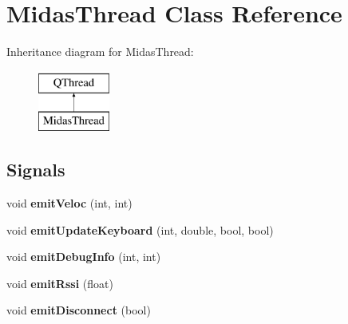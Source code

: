 \hypertarget{class_midas_thread}{\section{Midas\+Thread Class Reference}
\label{class_midas_thread}
}
Inheritance diagram for Midas\+Thread\+:\begin{figure}[H]
\begin{center}
\leavevmode
\includegraphics[height=2.000000cm]{class_midas_thread}
\end{center}
\end{figure}
\subsection*{Signals}
\begin{DoxyCompactItemize}
\item 
\hypertarget{class_midas_thread_acbe7ade3692dc7ff6e4ea467f5ea1ca5}{void {\bfseries emit\+Veloc} (int, int)}\label{class_midas_thread_acbe7ade3692dc7ff6e4ea467f5ea1ca5}

\item 
\hypertarget{class_midas_thread_ac05c3c7378833a0a86ffe4caabbbaca0}{void {\bfseries emit\+Update\+Keyboard} (int, double, bool, bool)}\label{class_midas_thread_ac05c3c7378833a0a86ffe4caabbbaca0}

\item 
\hypertarget{class_midas_thread_a73ff011dab8fd9eca9080b60dd3dcb62}{void {\bfseries emit\+Debug\+Info} (int, int)}\label{class_midas_thread_a73ff011dab8fd9eca9080b60dd3dcb62}

\item 
\hypertarget{class_midas_thread_ab28355ef536f2e9c009226c3dcb7c739}{void {\bfseries emit\+Rssi} (float)}\label{class_midas_thread_ab28355ef536f2e9c009226c3dcb7c739}

\item 
\hypertarget{class_midas_thread_a312737c6bc128e027e0f63652dc83a08}{void {\bfseries emit\+Disconnect} (bool)}\label{class_midas_thread_a312737c6bc128e027e0f63652dc83a08}

\end{DoxyCompactItemize}
